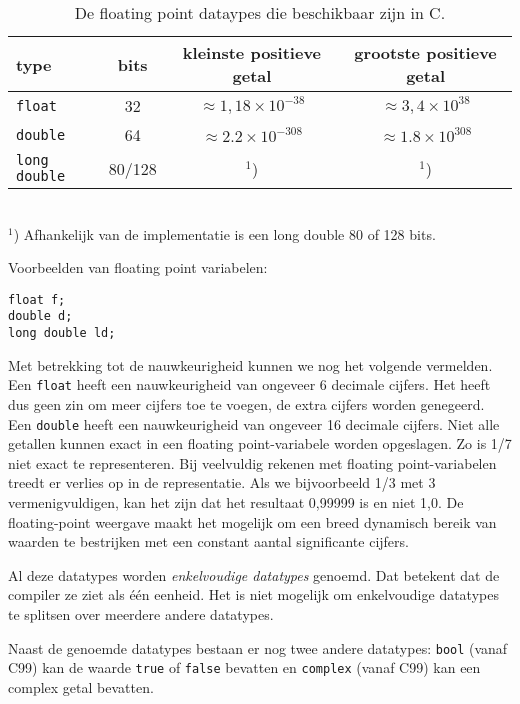\begin{table}[!ht]
\centering
\caption{De floating point dataypes die beschikbaar zijn in C.}
\label{tab:varfloatdatatypes}
\begin{tabular}{@{}lccc@{}}
\toprule
\textbf{type}          & \textbf{bits} & \textbf{kleinste positieve getal} &  \textbf{grootste positieve getal} \\ \midrule
\texttt{float}         & 32                      & $\approx1,18\times10^{-38}$ & $\approx3,4\times10^{38}$  \\
\texttt{double   }     & 64                      & $\approx2.2\times10^{-308}$ & $\approx1.8\times10^{308}$ \\
\texttt{long double}   & 80/128                      & $^1$) & $^1$)  \\
\bottomrule
\end{tabular}\\\vspace*{1mm}
\footnotesize$^1$) Afhankelijk van de implementatie is een long double 80 of 128 bits.
\end{table}

Voorbeelden van floating point variabelen:

\begin{lstlisting}[style=lstoneline]
float f;
double d;
long double ld;
\end{lstlisting}

Met betrekking tot de nauwkeurigheid kunnen we nog het volgende vermelden. Een \texttt{float} heeft een nauwkeurigheid van ongeveer 6 decimale cijfers. Het heeft dus geen zin om meer cijfers toe te voegen, de extra cijfers worden genegeerd. Een \texttt{double} heeft een nauwkeurigheid van ongeveer 16 decimale cijfers. Niet alle getallen kunnen exact in een floating point-variabele worden opgeslagen. Zo is 1/7 niet exact te representeren. Bij veelvuldig rekenen met floating point-variabelen treedt er verlies op in de representatie. Als we bijvoorbeeld 1/3 met 3 vermenigvuldigen, kan het zijn dat het resultaat 0,99999 is en niet 1,0. De floating-point weergave maakt het mogelijk om een breed dynamisch bereik van waarden te bestrijken met een constant aantal significante cijfers.

Al deze datatypes worden \textsl{enkelvoudige datatypes} genoemd. Dat betekent dat de compiler ze ziet als één eenheid. Het is niet mogelijk om enkelvoudige datatypes te splitsen over meerdere andere datatypes.

Naast de genoemde datatypes bestaan er nog twee andere datatypes: \texttt{bool} (vanaf C99) kan de waarde \texttt{true} of \texttt{false} bevatten en \texttt{complex} (vanaf C99) kan een complex getal bevatten.


